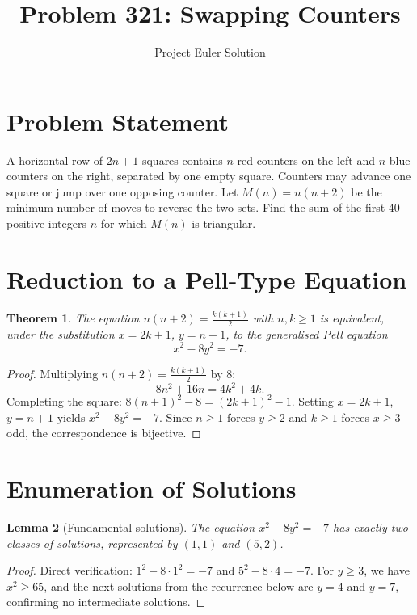 \documentclass[12pt]{article}
\title{Problem 321: Swapping Counters}
\author{Project Euler Solution}
\date{}
\newtheorem{theorem}{Theorem}
\newtheorem{lemma}[theorem]{Lemma}
\begin{document}
\maketitle

\section{Problem Statement}
A horizontal row of $2n+1$ squares contains $n$ red counters on the left and $n$ blue counters on the right, separated by one empty square.  Counters may advance one square or jump over one opposing counter.  Let $M(n)=n(n+2)$ be the minimum number of moves to reverse the two sets.  Find the sum of the first 40 positive integers $n$ for which $M(n)$ is triangular.

\section{Reduction to a Pell-Type Equation}

\begin{theorem}\label{thm:pell}
The equation $n(n+2)=\tfrac{k(k+1)}{2}$ with $n,k\ge 1$ is equivalent, under the substitution $x=2k+1$, $y=n+1$, to the generalised Pell equation
\[
x^2 - 8y^2 = -7.
\]
\end{theorem}

\begin{proof}
Multiplying $n(n+2)=\tfrac{k(k+1)}{2}$ by 8:
\[
8n^2+16n = 4k^2+4k.
\]
Completing the square: $8(n+1)^2-8=(2k+1)^2-1$.  Setting $x=2k+1$, $y=n+1$ yields $x^2-8y^2=-7$.  Since $n\ge 1$ forces $y\ge 2$ and $k\ge 1$ forces $x\ge 3$ odd, the correspondence is bijective.
\end{proof}

\section{Enumeration of Solutions}

\begin{lemma}[Fundamental solutions]\label{lem:fund}
The equation $x^2-8y^2=-7$ has exactly two classes of solutions, represented by $(1,1)$ and $(5,2)$.
\end{lemma}

\begin{proof}
Direct verification: $1^2-8\cdot 1^2=-7$ and $5^2-8\cdot 4=-7$.  For $y\ge 3$, we have $x^2\ge 65$, and the next solutions from the recurrence below are $y=4$ and $y=7$, confirming no intermediate solutions.
\end{proof}
\end{document}
